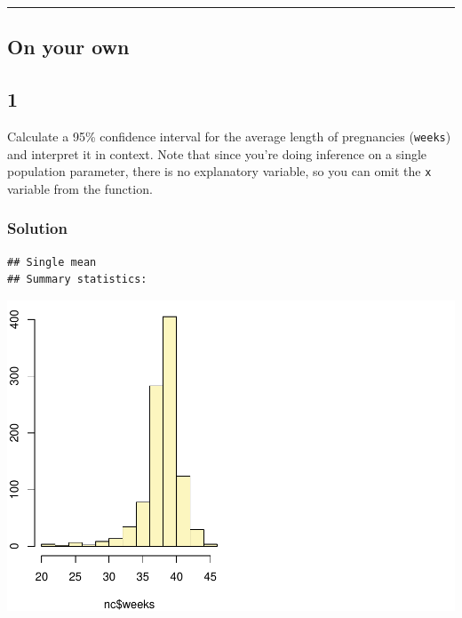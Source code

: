 \documentclass[]{article}
\newenvironment{Shaded}{\begin{snugshade}}{\end{snugshade}}
\newcommand{\KeywordTok}[1]{\textcolor[rgb]{0.13,0.29,0.53}{\textbf{#1}}}
\newcommand{\DataTypeTok}[1]{\textcolor[rgb]{0.13,0.29,0.53}{#1}}
\newcommand{\DecValTok}[1]{\textcolor[rgb]{0.00,0.00,0.81}{#1}}
\newcommand{\StringTok}[1]{\textcolor[rgb]{0.31,0.60,0.02}{#1}}
\newcommand{\OperatorTok}[1]{\textcolor[rgb]{0.81,0.36,0.00}{\textbf{#1}}}
\newcommand{\NormalTok}[1]{#1}
\begin{document}
\begin{center}\rule{0.5\linewidth}{\linethickness}\end{center}

\subsection{On your own}\label{on-your-own}

\subsection{1}\label{section}

Calculate a 95\% confidence interval for the average length of
pregnancies (\texttt{weeks}) and interpret it in context. Note that
since you're doing inference on a single population parameter, there is
no explanatory variable, so you can omit the \texttt{x} variable from
the function.

\subsubsection{Solution}\label{solution-5}

\begin{Shaded}
\end{Shaded}

\begin{verbatim}
## Single mean 
## Summary statistics:
\end{verbatim}

\includegraphics{DATA_606_Lab_5_files/figure-latex/unnamed-chunk-6-1.pdf}
\end{document}
